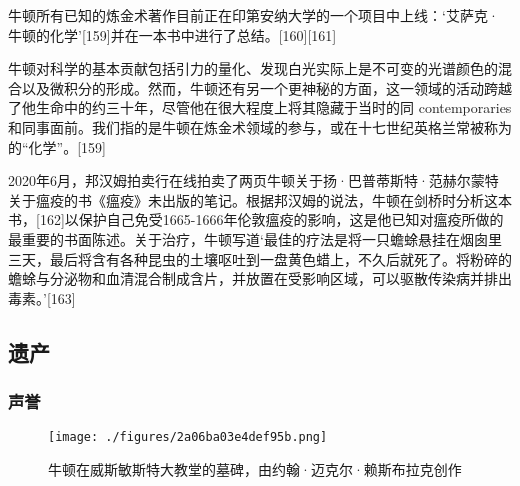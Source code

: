 牛顿所有已知的炼金术著作目前正在印第安纳大学的一个项目中上线：‘艾萨克·牛顿的化学’[159]并在一本书中进行了总结。[160][161]

牛顿对科学的基本贡献包括引力的量化、发现白光实际上是不可变的光谱颜色的混合以及微积分的形成。然而，牛顿还有另一个更神秘的方面，这一领域的活动跨越了他生命中的约三十年，尽管他在很大程度上将其隐藏于当时的同 contemporaries 和同事面前。我们指的是牛顿在炼金术领域的参与，或在十七世纪英格兰常被称为的“化学”。[159]

2020年6月，邦汉姆拍卖行在线拍卖了两页牛顿关于扬·巴普蒂斯特·范赫尔蒙特关于瘟疫的书《瘟疫》未出版的笔记。根据邦汉姆的说法，牛顿在剑桥时分析这本书，[162]以保护自己免受1665-1666年伦敦瘟疫的影响，这是他已知对瘟疫所做的最重要的书面陈述。关于治疗，牛顿写道‘最佳的疗法是将一只蟾蜍悬挂在烟囱里三天，最后将含有各种昆虫的土壤呕吐到一盘黄色蜡上，不久后就死了。将粉碎的蟾蜍与分泌物和血清混合制成含片，并放置在受影响区域，可以驱散传染病并排出毒素。’[163]
\subsection{遗产}  
\subsubsection{声誉}
\begin{figure}[ht]
\centering
\texttt{[image: ./figures/2a06ba03e4def95b.png]}
\caption{牛顿在威斯敏斯特大教堂的墓碑，由约翰·迈克尔·赖斯布拉克创作} \label{fig_Newton_12}
\end{figure}